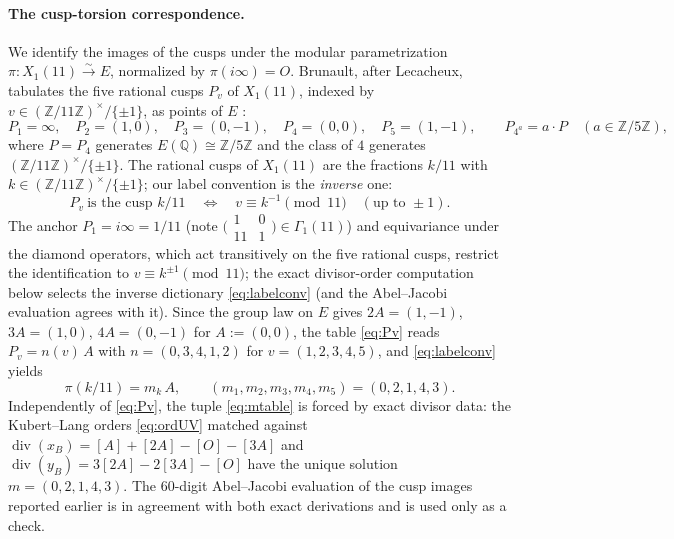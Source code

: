 \paragraph{The cusp-torsion correspondence.}
We identify the images of the cusps under the modular parametrization
$\pi : X_1(11) \xrightarrow{\sim} E$, normalized by $\pi(i\infty) = O$.
Brunault, after Lecacheux, tabulates the five rational cusps $P_v$ of
$X_1(11)$, indexed by $v \in (\mathbb Z/11\mathbb Z)^\times/\{\pm 1\}$, as
points of $E$ \cite[(3.152)--(3.153)]{BrunaultThesis}:
\begin{equation}\label{eq:Pv}
  P_1 = \infty, \quad P_2 = (1,0), \quad P_3 = (0,-1), \quad
  P_4 = (0,0), \quad P_5 = (1,-1), \qquad
  P_{4^a} = a\cdot P \quad (a \in \mathbb Z/5\mathbb Z),
\end{equation}
where $P = P_4$ generates $E(\mathbb{Q}) \cong \mathbb Z/5\mathbb Z$ and the
class of $4$ generates $(\mathbb Z/11\mathbb Z)^\times/\{\pm 1\}$. The rational
cusps of $X_1(11)$ are the fractions $k/11$ with
$k \in (\mathbb Z/11\mathbb Z)^\times/\{\pm 1\}$; our label convention is the
\emph{inverse} one:
\begin{equation}\label{eq:labelconv}
  P_v \ \text{is the cusp } k/11
  \quad\Longleftrightarrow\quad
  v \equiv k^{-1} \pmod{11} \quad (\text{up to } \pm 1).
\end{equation}
The anchor $P_1 = i\infty = 1/11$ (note
$\bigl(\begin{smallmatrix}1&0\\11&1\end{smallmatrix}\bigr) \in \Gamma_1(11)$)
and equivariance under the diamond operators, which act transitively on the
five rational cusps, restrict the identification to $v \equiv k^{\pm 1}
\pmod{11}$; the exact divisor-order computation below selects the inverse
dictionary \eqref{eq:labelconv} (and the Abel--Jacobi evaluation agrees with
it).
Since the group law on $E$ gives $2A = (1,-1)$, $3A = (1,0)$, $4A = (0,-1)$ for
$A := (0,0)$, the table \eqref{eq:Pv} reads $P_v = n(v)\,A$ with
$n = (0,3,4,1,2)$ for $v = (1,2,3,4,5)$, and \eqref{eq:labelconv} yields
\begin{equation}\label{eq:mtable}
  \pi(k/11) = m_k\,A, \qquad
  (m_1, m_2, m_3, m_4, m_5) = (0, 2, 1, 4, 3).
\end{equation}
Independently of \eqref{eq:Pv}, the tuple \eqref{eq:mtable} is forced by exact
divisor data: the Kubert--Lang orders \eqref{eq:ordUV} matched against
$\operatorname{div}(x_B) = [A] + [2A] - [O] - [3A]$ and
$\operatorname{div}(y_B) = 3[2A] - 2[3A] - [O]$ have the unique solution
$m = (0,2,1,4,3)$. The $60$-digit Abel--Jacobi evaluation of the cusp images
reported earlier is in agreement with both exact derivations and is used only
as a check.
